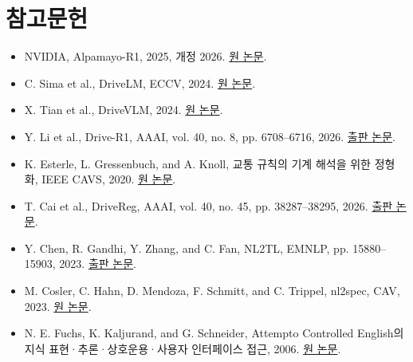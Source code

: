 \documentclass[11pt,a4paper]{article}
\begin{document}
\section*{참고문헌}

\begin{itemize}
\item [1] NVIDIA, Alpamayo-R1, 2025, 개정 2026. \href{\detokenize{https://arxiv.org/abs/2511.00088}}{원 논문}.
\item [2] C. Sima et al., DriveLM, ECCV, 2024. \href{\detokenize{https://arxiv.org/abs/2312.14150}}{원 논문}.
\item [3] X. Tian et al., DriveVLM, 2024. \href{\detokenize{https://arxiv.org/abs/2402.12289}}{원 논문}.
\item [4] Y. Li et al., Drive-R1, AAAI, vol. 40, no. 8, pp. 6708–6716, 2026. \href{\detokenize{https://ojs.aaai.org/index.php/AAAI/article/view/37602}}{출판 논문}.
\item [5] K. Esterle, L. Gressenbuch, and A. Knoll, 교통 규칙의 기계 해석을 위한 정형화, IEEE CAVS, 2020. \href{\detokenize{https://arxiv.org/abs/2007.00330}}{원 논문}.
\item [6] T. Cai et al., DriveReg, AAAI, vol. 40, no. 45, pp. 38287–38295, 2026. \href{\detokenize{https://ojs.aaai.org/index.php/AAAI/article/view/41168}}{출판 논문}.
\item [7] Y. Chen, R. Gandhi, Y. Zhang, and C. Fan, NL2TL, EMNLP, pp. 15880–15903, 2023. \href{\detokenize{https://aclanthology.org/2023.emnlp-main.985/}}{출판 논문}.
\item [8] M. Cosler, C. Hahn, D. Mendoza, F. Schmitt, and C. Trippel, nl2spec, CAV, 2023. \href{\detokenize{https://arxiv.org/abs/2303.04864}}{원 논문}.
\item [9] N. E. Fuchs, K. Kaljurand, and G. Schneider, Attempto Controlled English의 지식 표현·추론·상호운용·사용자 인터페이스 접근, 2006. \href{\detokenize{https://attempto.ifi.uzh.ch/site/pubs/papers/FLAIRS0601FuchsN.pdf}}{원 논문}.
\end{itemize}
\end{document}
